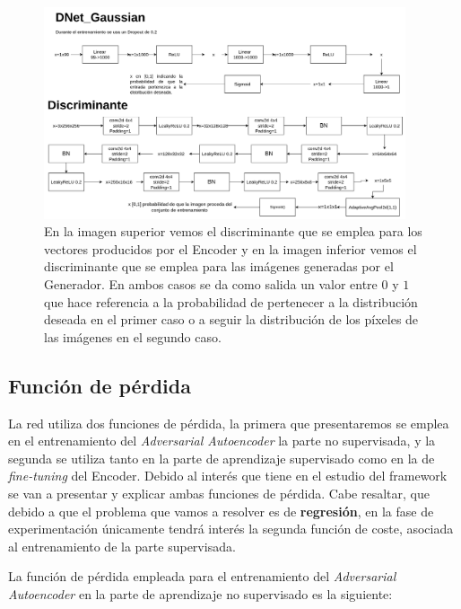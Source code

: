             \begin{figure}[H]
                \centering
                \includegraphics[width=0.95\textwidth]{img/DGaussian.png}
                \caption{En la imagen superior vemos el discriminante que se emplea para los vectores producidos por el Encoder y en la imagen inferior vemos el discriminante que se emplea para las imágenes generadas por el Generador. En ambos casos se da como salida un valor entre $0$ y $1$ que hace referencia a la probabilidad de pertenecer a la distribución deseada en el primer caso o a seguir la distribución de los píxeles de las imágenes en el segundo caso.}
                \label{fig:DGaussian}
            \end{figure}
            
        \subsection{Función de pérdida}

            \noindent La red utiliza dos funciones de pérdida, la primera que presentaremos se emplea en el entrenamiento del \textit{Adversarial Autoencoder}  la parte no supervisada, y la segunda se utiliza tanto en la parte de aprendizaje supervisado como en la de \textit{fine-tuning} del Encoder. Debido al interés que tiene en el estudio del framework se van a presentar y explicar ambas funciones de pérdida. Cabe resaltar, que debido a que el problema que vamos a resolver es de \textbf{regresión}, en la fase de experimentación únicamente tendrá interés la segunda función de coste, asociada al entrenamiento de la parte supervisada.

            \medskip

            \noindent La función de pérdida empleada para el entrenamiento del \textit{Adversarial Autoencoder} en la parte de aprendizaje no supervisado es la siguiente: 
            
